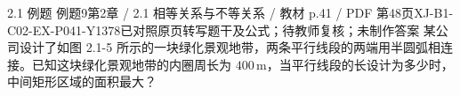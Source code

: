 \par\noindent\begin{minipage}{\linewidth}
\begin{bankitem}{2.1 例题 例题9}{第2章 / 2.1 相等关系与不等关系 / 教材 p.41 / PDF 第48页}{XJ-B1-C02-EX-P041-Y1378}{已对照原页转写题干及公式；待教师复核；未制作答案}
某公司设计了如图 2.1-5 所示的一块绿化景观地带，两条平行线段的两端用半圆弧相连接。已知这块绿化景观地带的内圈周长为 $400\,\mathrm m$，当平行线段的长设计为多少时，中间矩形区域的面积最大？
\end{bankitem}
\end{minipage}\par\medskip
